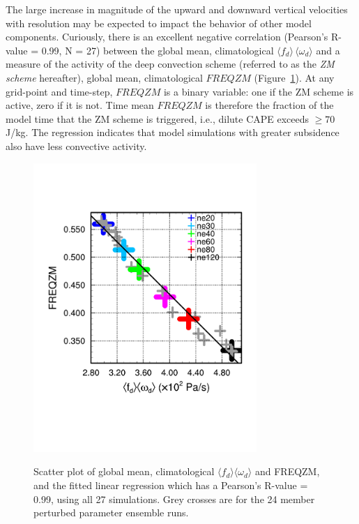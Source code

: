 \documentclass[times]{qjrms4}
\begin{document}
The large increase in magnitude of the upward and downward vertical velocities with resolution may be expected to impact the behavior of other model components. Curiously, there is an excellent negative correlation (Pearson's R-value = 0.99, N = 27) between the global mean, climatological $\langle f_{d} \rangle \, \langle \omega_{d} \rangle$ and a measure of the activity of the \cite{ZM1995AO} deep convection scheme (referred to as the {\em{ZM scheme}} hereafter), global mean, climatological $FREQZM$ (Figure~\ref{fig:corr}). At any grid-point and time-step, $FREQZM$ is a binary variable: one if the ZM scheme is active, zero if it is not. Time mean $FREQZM$ is therefore the fraction of the model time that the ZM scheme is triggered, i.e., dilute CAPE exceeds $\geq 70$ J/kg. The regression indicates that model simulations with greater subsidence also have less convective activity.

\begin{figure}
\begin{center}
\noindent\includegraphics[width=20pc,angle=0]{figs/temp_diags_corr.pdf}\\
\end{center}
\caption{Scatter plot of global mean, climatological $\langle f_{d} \rangle \langle \omega_{d} \rangle$ and FREQZM, and the fitted linear regression which has a Pearson's R-value = 0.99, using all 27 simulations. Grey crosses are for the 24 member perturbed parameter ensemble runs.}
\label{fig:corr}
\end{figure}
\end{document}
